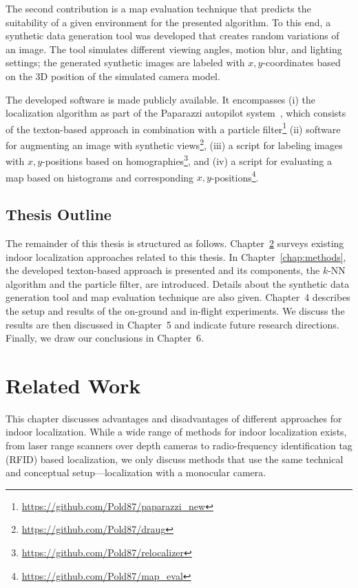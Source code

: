 \documentclass[11pt]{report}
\begin{document}
The second contribution is a map evaluation technique that predicts
the suitability of a given environment for the presented algorithm. To
this end, a synthetic data generation tool was developed that creates
random variations of an image. The tool simulates different viewing
angles, motion blur, and lighting settings; the generated synthetic
images are labeled with $x,y$-coordinates based on the 3D position of
the simulated camera model.

The developed software is made publicly available. It encompasses (i)
the localization algorithm as part of the Paparazzi autopilot
system~\cite{brisset2006paparazzi}, which consists of the texton-based
approach in combination with a particle
filter\footnote{\url{https://github.com/Pold87/paparazzi_new}} (ii)
software for augmenting an image with synthetic
views\footnote{\url{https://github.com/Pold87/draug}}, (iii) a script
for labeling images with $x,y$-positions based on
homographies\footnote{\url{https://github.com/Pold87/relocalizer}},
and (iv) a script for evaluating a map based on histograms and
corresponding
$x,y$-positions\footnote{\url{https://github.com/Pold87/map_eval}}.


\section{Thesis Outline}
\label{sec:outline}

The remainder of this thesis is structured as follows.
Chapter~\ref{chap:relatedwork} surveys existing indoor localization
approaches related to this thesis. In Chapter~\ref{chap:methods}, the
developed texton-based approach is presented and its components, the
$k$-NN algorithm and the particle filter, are introduced. Details
about the synthetic data generation tool and map evaluation technique
are also given. Chapter~4 describes the setup and results of the
on-ground and in-flight experiments. We discuss the results are then
discussed in Chapter~5 and indicate future research
directions. Finally, we draw our conclusions in
Chapter~6.%

\chapter{Related Work}
\label{chap:relatedwork}

This chapter discusses advantages and disadvantages of different
approaches for indoor localization.
While a wide range of methods for indoor localization exists, from
laser range scanners over depth cameras to radio-frequency
identification tag (RFID) based localization, we only discuss methods
that use the same technical and conceptual setup---localization with a
monocular camera.
\end{document}
